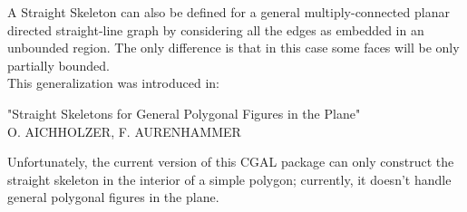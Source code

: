 A Straight Skeleton can also be defined for a general multiply-connected planar directed straight-line graph by considering all the edges as embedded in an unbounded region. The only difference is that in this case some faces will be only partially bounded.\\
This generalization was introduced in:

"Straight Skeletons for General Polygonal Figures in the Plane"\\
O. AICHHOLZER, F. AURENHAMMER

Unfortunately, the current version of this CGAL package can only construct the straight skeleton in the interior of a simple polygon; currently, it doesn't handle general polygonal figures in the plane.


